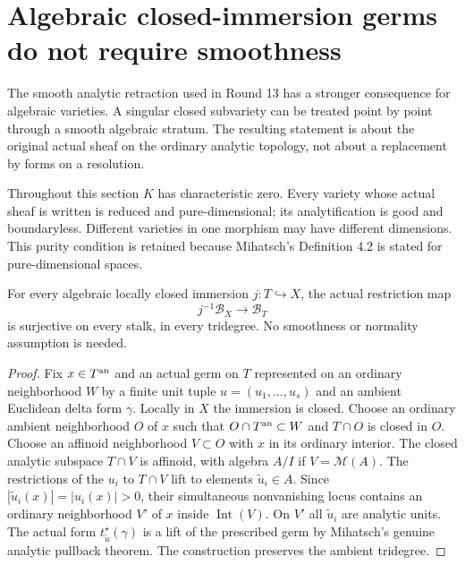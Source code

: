 \section{Algebraic closed-immersion germs do not require smoothness}
\label{r14l:section}

The smooth analytic retraction used in Round 13 has a stronger
consequence for algebraic varieties. A singular closed subvariety
can be treated point by point through a smooth algebraic stratum.
The resulting statement is about the original actual sheaf on
the ordinary analytic topology, not about a replacement by forms
on a resolution.

Throughout this section $K$ has characteristic zero. Every variety
whose actual sheaf is written is reduced and pure-dimensional;
its analytification is good and boundaryless. Different varieties
in one morphism may have different dimensions. This purity
condition is retained because Mihatsch's Definition 4.2 is stated
for pure-dimensional spaces.

\begin{lemma}
\label{r14l:local-lift}
For every algebraic locally closed immersion $j:T\hookrightarrow X$,
the actual restriction map
\[
                           j^{-1}\mathcal B_X\longrightarrow\mathcal B_T
\tag{L1}\label{r14l:restriction}
\]
is surjective on every stalk, in every tridegree.
No smoothness or normality assumption is needed.
\end{lemma}

\begin{proof}
Fix $x\in T^{\rm an}$ and an actual germ on $T$ represented
on an ordinary neighborhood $W$ by a finite unit tuple
$u=(u_1,\ldots,u_s)$ and an ambient Euclidean delta form $\gamma$.
Locally in $X$ the immersion is closed. Choose an ordinary
ambient neighborhood $O$ of $x$ such that
$O\cap T^{\rm an}\subset W$ and $T\cap O$ is closed in $O$.
Choose an affinoid neighborhood $V\subset O$ with $x$ in its
ordinary interior. The closed analytic subspace $T\cap V$ is
affinoid, with algebra $A/I$ if $V=\mathcal M(A)$.
The restrictions of the $u_i$ to $T\cap V$ lift to elements
$\widetilde u_i\in A$. Since
$|\widetilde u_i(x)|=|u_i(x)|>0$, their simultaneous nonvanishing
locus contains an ordinary neighborhood $V'$ of $x$ inside
$\operatorname{Int}(V)$. On $V'$ all $\widetilde u_i$ are
analytic units. The actual form
$t_{\widetilde u}^{\star}(\gamma)$ is a lift of the prescribed
germ by Mihatsch's genuine analytic pullback theorem. The
construction preserves the ambient tridegree.
\end{proof}

